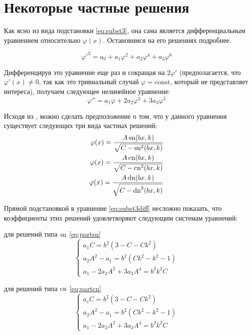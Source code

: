 \section{Некоторые частные решения}\label{sec:part}

Как ясно из вида подстановки \eqref{eq:subst3}, она сама является дифференциальным уравнением относительно $\varphi(x)$. Остановимся на его решениях подробнее.

\begin{equation}
\varphi'^2 = a_0 + a_1\varphi^2 + a_2\varphi^4 + a_3\varphi^6
\end{equation}

Дифференцируя это уравнение еще раз и сокращая на $2\varphi'$
(предполагается, что $\varphi'(x) \ne 0$, так как это тривиальный случай $\varphi = \mathrm{const}$, который не представляет интереса), получаем следующее нелинейное уравнение:
\begin{equation}
\varphi'' = a_1\varphi + 2a_2\varphi^3 + 3a_3\varphi^5
\label{eq:subst3diff}
\end{equation}

Исходя из \cite{Ishibashi1984, Kovalev1976}, можно сделать предположение о том, что у данного уравнения существует следующих три вида частных решений:
\begin{align}
\varphi(x) = \frac{A\operatorname{sn}(bx,k)}{\sqrt{C-\operatorname{sn}^2(bx,k)}}\label{eq:partsn}\\
\varphi(x) = \frac{A\operatorname{cn}(bx,k)}{\sqrt{C-\operatorname{cn}^2(bx,k)}}\label{eq:partcn}\\
\varphi(x) = \frac{A\operatorname{dn}(bx,k)}{\sqrt{C-\operatorname{dn}^2(bx,k)}}\label{eq:partdn}
\end{align}

Прямой подстановкой в уравнение \eqref{eq:subst3diff} несложно показать, что коэффициенты этих решений удовлетворяют следующим системам уравнений:

для решений типа $\operatorname{sn}$ \eqref{eq:partsn}
\begin{equation}
\begin{cases}
a_1 C = b^2 \left(3 - C - Ck^2\right) \\
a_2 A^2 - a_1 = b^2\left(Ck^2 - k^2 - 1\right)\\
a_1 - 2a_2 A^2 + 3a_3 A^4 = b^2 k^2 C
\end{cases}
\end{equation}

для решений типа $\operatorname{cn}$ \eqref{eq:partcn}
\begin{equation}
\begin{cases}
a_c C = b^2 \left(3 - C - Ck^2\right)\\
a_2 A^2 - a_1 = b^2\left(Ck^2 - k^2 - 1\right)\\
a_1 - 2a_2 A^2 + 3a_3 A^4 = b^2k^2C
\end{cases}
\end{equation}


